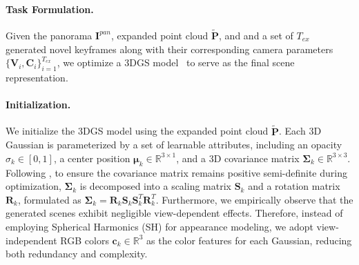 \documentclass{article} %
\newcommand{\todo}[1]{\textcolor{red}{[TODO]:#1}}
\begin{document}
\paragraph{Task Formulation.} 
Given the panorama $\mathbf{I}^{pan}$, expanded point cloud $\mathbf{\tilde{P}}$, and and a set of $T_{ex}$ generated novel keyframes along with their corresponding camera parameters $\{\mathbf{V}_i, \mathbf{C}_i\}_{i=1}^{T_{ex}}$, we optimize a 3DGS model~\citep{kerbl20233d} to serve as the final scene representation.


\paragraph{Initialization.}
We initialize the 3DGS model using the expanded point cloud $\mathbf{\tilde{P}}$. Each 3D Gaussian is parameterized by a set of learnable attributes, including an opacity $\sigma_k \in [0,1]$, a center position $\boldsymbol{\mu}_k \in \mathbb{R}^{3 \times 1}$, and a 3D covariance matrix $\mathbf{\Sigma}_k \in \mathbb{R}^{3 \times 3}$. 
Following \citep{kerbl20233d}, to ensure the covariance matrix remains positive semi-definite during optimization, $\mathbf{\Sigma}_k$ is decomposed into a scaling matrix $\mathbf{S}_k$ and a rotation matrix $\mathbf{R}_k$, formulated as $\mathbf{\Sigma}_k = \mathbf{R}_k \mathbf{S}_k \mathbf{S}_k^{T} \mathbf{R}_k^{T}$. 
Furthermore, we empirically observe that the generated scenes exhibit negligible view-dependent effects. Therefore, instead of employing Spherical Harmonics (SH) for appearance modeling, we adopt view-independent RGB colors $\mathbf{c}_k \in \mathbb{R}^{3}$ as the color features for each Gaussian, reducing both redundancy and complexity.

\end{document}

